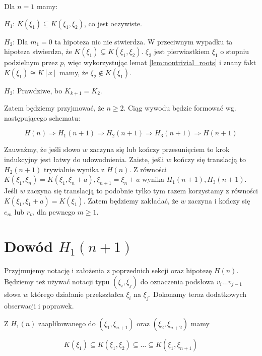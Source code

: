 Dla $n=1$ mamy:
\begin{description}
  \item{$H_1$:}
    $K\left(\xi_1\right) \subseteq K\left(\xi_1, \xi_2\right)$, co jest
    oczywiste.
  \item{$H_2$:} Dla $m_1 = 0$ ta hipoteza nic nie stwierdza. W przeciwnym
    wypadku ta hipoteza stwierdza, że $K\left(\xi_1\right) \subsetneq K\left(\xi_1,
    \xi_2\right)$. $\xi_2$ jest pierwiastkiem $\xi_1$ o stopniu podzielnym przez
    $p$, więc wykorzystując lemat \ref{lem:nontrivial_roots} i znany fakt
    $K\left(\xi_1\right) \cong K[x]$ mamy, że $\xi_2 \not \in
    K\left(\xi_1\right)$.
  \item{$H_3$:} Prawdziwe, bo $K_{k+1} = K_2$.

\end{description}

Zatem będziemy przyjmować, że $n \geq 2$. Ciąg wywodu będzie formować wg.
następującego schematu:

\[ H(n) \Rightarrow H_1(n+1) \Rightarrow H_2(n+1) \Rightarrow H_3(n+1)
\Rightarrow H(n+1)\]

Zauważmy, że jeśli słowo $w$ zaczyna się lub kończy przesunięciem to krok
indukcyjny jest łatwy do udowodnienia. Zaiste, jeśli $w$ kończy się translacją
to $H_2(n+1)$ trywialnie wynika z $H(n)$.  Z równości $K\left(\xi_1,
\xi_{n}\right) = K\left(\xi_1, \xi_{n} + a\right), \xi_{n+1} = \xi_n + a$ wynika
$H_1(n+1), H_3(n+1)$. Jeśli $w$ zaczyna się translacją to podobnie tylko tym
razem korzystamy z równości $K\left(\xi_1, \xi_1 + a\right) =
K\left(\xi_1\right)$. Zatem będziemy zakładać, że $w$ zaczyna i kończy się $e_m$
lub $r_m$ dla pewnego $m \geq 1$.

\section{Dowód $H_1(n+1)$}
Przyjmujemy notację i założenia z poprzednich sekcji oraz hipotezę $H(n)$.
Będziemy też używać notacji typu $\left(\xi_i, \xi_j\right)$ do oznaczenia
podsłowa $v_i\ldots v_{j-1}$ słowa $w$ którego działanie przekształca $\xi_i$ na
$\xi_j$. Dokonamy teraz dodatkowych obserwacji i poprawek.

Z $H_1(n)$ zaaplikowanego do $\left(\xi_1, \xi_{n+1}\right)$ oraz $\left(\xi_2,
\xi_{n+2}\right)$ mamy

\begin{equation}
  K\left(\xi_1\right) \subseteq
  K\left(\xi_1, \xi_2\right) \subseteq
  \ldots \subseteq
  K\left(\xi_1, \xi_{n+1}\right)
  \label{eq:h_1_first}
\end{equation}

